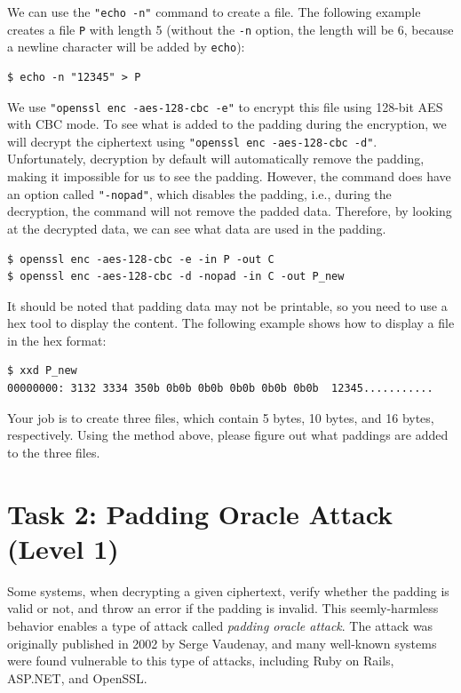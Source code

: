 We can use the \texttt{"echo -n"} command to create a file.
The following example
creates a file \texttt{P} with length 5 (without the \texttt{-n} option, the length will
be 6, because a newline character will be added by \texttt{echo}):

\begin{lstlisting}
$ echo -n "12345" > P
\end{lstlisting}

We use \texttt{"openssl enc -aes-128-cbc -e"} to encrypt this file
using 128-bit AES with CBC mode.
To see what is added to the padding during the encryption, 
we will decrypt the ciphertext using \texttt{"openssl enc -aes-128-cbc -d"}.
Unfortunately, decryption by default will automatically remove the padding, making it
impossible for us to see the padding. However, the command does have an option called
\texttt{"-nopad"}, which disables the padding, i.e., during the decryption, the command will not
remove the padded data. Therefore, by looking at the decrypted
data, we can see what data are used in the padding.

\begin{lstlisting}
$ openssl enc -aes-128-cbc -e -in P -out C
$ openssl enc -aes-128-cbc -d -nopad -in C -out P_new
\end{lstlisting}

It should be noted that padding data may not be printable, so you need to
use a hex tool to display the content. The following example shows
how to display a file in the hex format:

\begin{lstlisting}
$ xxd P_new
00000000: 3132 3334 350b 0b0b 0b0b 0b0b 0b0b 0b0b  12345...........
\end{lstlisting}

Your job is to create three files, which contain 5 bytes, 10 bytes, and 16 bytes, respectively.
Using the method above, please figure out what paddings are added to the three files.



\section{Task 2: Padding Oracle Attack (Level 1)}

Some systems, when decrypting a given ciphertext,
verify whether the padding is valid or not,  
and throw an error if the padding is invalid. This 
seemly-harmless behavior enables a type of attack 
called \textit{padding oracle attack}.
The attack was originally published in 2002 by Serge Vaudenay, and 
many well-known systems were found vulnerable to this type of 
attacks, including Ruby on Rails, ASP.NET, and OpenSSL. 




